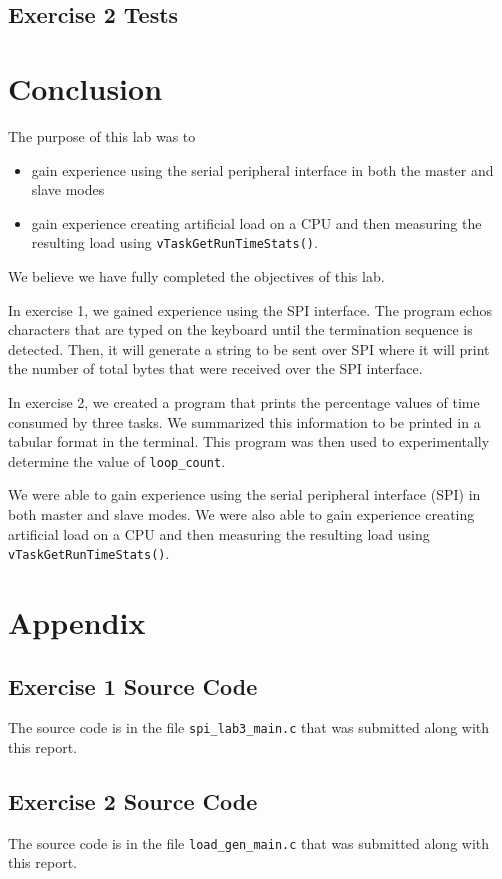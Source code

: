 \documentclass[11pt, letterpaper, titlepage]{article}
\begin{document}
\subsection{Exercise 2 Tests}

\section{Conclusion}
The purpose of this lab was to 
\begin{itemize}
  \item gain experience using the serial peripheral interface in both the master and slave modes
  \item gain experience creating artificial load on a CPU and then measuring the resulting load using \texttt{vTaskGetRunTimeStats()}.
\end{itemize}

We believe we have fully completed the objectives of this lab.

In exercise 1, we gained experience using the SPI interface. The program echos characters that are typed on the keyboard until the termination sequence is detected. Then, it will generate a string to be sent over SPI where it will print the number of total bytes that were received over the SPI interface.

In exercise 2, we created a program that prints the percentage values of time consumed by three tasks. We summarized this information to be printed in a tabular format in the terminal. This program was then used to experimentally determine the value of \texttt{loop_count}.

We were able to gain experience using the serial peripheral interface (SPI) in both master and slave modes. We were also able to gain experience creating artificial load on a CPU and then measuring the resulting load using \texttt{vTaskGetRunTimeStats()}.

\section{Appendix}

\subsection{Exercise 1 Source Code}
The source code is in the file \texttt{spi_lab3_main.c} that was submitted along with this report.

\subsection{Exercise 2 Source Code}
The source code is in the file \texttt{load_gen_main.c} that was submitted along with this report.
\end{document}

